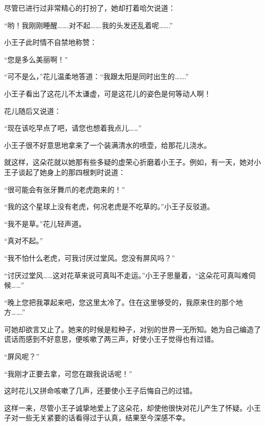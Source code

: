 尽管已进行过非常精心的打扮了，她却打着哈欠说道：

“哟！我刚刚睡醒\ldots{}\ldots{}.对不起\ldots{}\ldots{}.我的头发还乱着呢\ldots{}\ldots{}.”

小王子此时情不自禁地称赞：

“您是多么美丽啊！”

“可不是么，”花儿温柔地答道：“我跟太阳是同时出生的\ldots{}\ldots{}.”

小王子看出了这花儿不太谦虚，可是这花儿的姿色是何等动人啊！

花儿随后又说道：

“现在该吃早点了吧，请您也想着我点儿\ldots{}\ldots{}”

{\startalignment[center]
 \stopalignment}

小王子很不好意思地拿来了一个装满清水的喷壶，给那花儿浇水。

就这样，这朵花就以她那有些多疑的虚荣心折磨着小王子。例如，有一天，她对小王子谈起了她身上的那四根刺时说道：

“很可能会有张牙舞爪的老虎跑来的！”

“我的这个星球上没有老虎，何况老虎是不吃草的。”小王子反驳道。

“我不是草。”花儿轻声道。

“真对不起。”

{\startalignment[center]
 \stopalignment}

“我不怕什么老虎，可我讨厌过堂风。您没有屏风吗？”

“讨厌过堂风\ldots{}\ldots{}这对花草来说可真叫不走运。”小王子思量着，“这朵花可真叫难伺候\ldots{}\ldots{}”

{\startalignment[center]
 \stopalignment}

“晚上您把我罩起来吧，您这里太冷了。住在这里够受的，我原来住的那个地方\ldots{}\ldots{}.”

可她却欲言又止了。她来的时候是粒种子，对别的世界一无所知。她为自己编造了谎话而感到不好意思，便咳嗽了两三声，好使小王子觉得也有过错。

“屏风呢？”

“我刚才正要去拿，可您在跟我说话呢！”

这时花儿又拼命咳嗽了几声，还要使小王子后悔自己的过错。

这样一来，尽管小王子诚挚地爱上了这朵花，却使他很快对花儿产生了怀疑。小王子对一些无关紧要的话看得过于认真，结果至今深感不幸。

